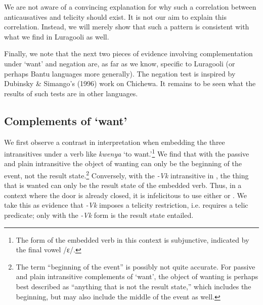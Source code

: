 \documentclass[output=paper]{langsci/langscibook}
\begin{document}
We are not aware of a convincing explanation for why such a correlation between anticausatives and telicity should exist. It is not our aim to explain this correlation. Instead, we will merely show that such a pattern is consistent with what we find in Luragooli as well. 

  Finally, we note that the next two pieces of evidence involving complementation under ‘want’ and negation are, as far as we know, specific to Luragooli (or perhaps Bantu languages more generally). The negation test is inspired by Dubinsky \& Simango’s (1996) work on Chichewa. It remains to be seen what the results of such tests are in other languages. 

\subsection{Complements of ‘want’}

We first observe a contrast in interpretation when embedding the three intransitives under a verb like \textit{kwenya} ‘to want.’\footnote{ The form of the embedded verb in this context is subjunctive, indicated by the final vowel /ɛ/.} We find that with the passive  and plain intransitive  the object of wanting can only be the beginning of the event, not the result state.\footnote{ The term “beginning of the event” is possibly not quite accurate. For passive and plain intransitive complements of ‘want’, the object of wanting is perhaps best described as “anything that is not the result state,” which includes the beginning, but may also include the middle of the event as well. } Conversely, with the \textit{-Vk} intransitive in , the thing that is wanted can only be the result state of the embedded verb. Thus, in a context where the door is already closed, it is infelicitous to use either  or . We take this as evidence that \textit{-Vk} imposes a telicity restriction, i.e. requires a telic predicate; only with the \textit{-Vk} form is the result state entailed.
\end{document}
